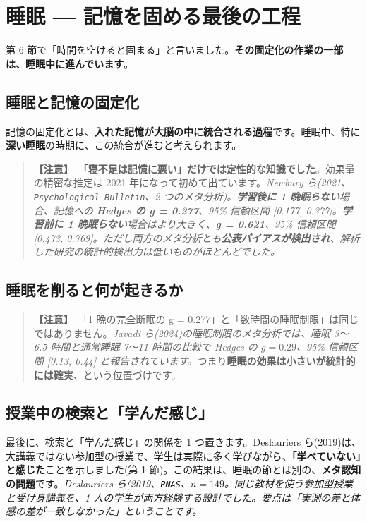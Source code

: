 \documentclass{article}
\begin{document}
\section{睡眠 — 記憶を固める最後の工程}

第 6 節で「時間を空けると固まる」と言いました。\textbf{その固定化の作業の一部は、睡眠中に進んでいます}。

\subsection{睡眠と記憶の固定化}

記憶の固定化とは、\textbf{入れた記憶が大脳の中に統合される過程}です。睡眠中、特に\textbf{深い睡眠}の時期に、この統合が進むと考えられます。

\begin{quote}
\textbf{【注意】}\ \textbf{「寝不足は記憶に悪い」だけでは定性的な知識でした}。効果量の精密な推定は 2021 年になって初めて出ています。\emph{Newbury ら(2021、\texttt{Psychological Bulletin}、2 つのメタ分析)。\textbf{学習後に 1 晩眠らない}場合、記憶への \textbf{Hedges の g = 0.277}、95\% 信頼区間 [0.177, 0.377]。\textbf{学習前に 1 晩眠らない}場合はより大きく、\textbf{g = 0.621}、95\% 信頼区間 [0.473, 0.769]。ただし両方のメタ分析とも\textbf{公表バイアスが検出され}、解析した研究の統計的検出力は低いものがほとんどでした。}
\end{quote}

\subsection{睡眠を削ると何が起きるか}

\begin{quote}
\textbf{【注意】}\ 「1 晩の完全断眠の g = 0.277」と「数時間の睡眠制限」は同じではありません。\emph{Javadi ら(2024)の睡眠制限のメタ分析では、睡眠 3〜6.5 時間と通常睡眠 7〜11 時間の比較で Hedges の \(g = 0.29\)、95\% 信頼区間 [0.13, 0.44] と報告されています。}つまり\textbf{睡眠の効果は小さいが統計的には確実}、という位置づけです。
\end{quote}

\subsection{授業中の検索と「学んだ感じ」}

最後に、検索と「学んだ感じ」の関係を 1 つ置きます。Deslauriers ら(2019)は、大講義ではない参加型の授業で、学生は実際に多く学びながら、\textbf{「学べていない」と感じた}ことを示しました(第 1 節)。この結果は、睡眠の節とは別の、\textbf{メタ認知の問題}です。\emph{Deslauriers ら(2019、\texttt{PNAS}、\(n = 149\)。同じ教材を使う参加型授業と受け身講義を、1 人の学生が両方経験する設計でした。要点は「実測の差と体感の差が一致しなかった」ということです。}
\end{document}
